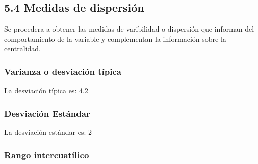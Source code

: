 \documentclass[
]{article}
\newenvironment{Shaded}{\begin{snugshade}}{\end{snugshade}}
\newcommand{\AttributeTok}[1]{\textcolor[rgb]{0.13,0.29,0.53}{#1}}
\newcommand{\CommentTok}[1]{\textcolor[rgb]{0.56,0.35,0.01}{\textit{#1}}}
\newcommand{\ConstantTok}[1]{\textcolor[rgb]{0.56,0.35,0.01}{#1}}
\newcommand{\FunctionTok}[1]{\textcolor[rgb]{0.13,0.29,0.53}{\textbf{#1}}}
\newcommand{\NormalTok}[1]{#1}
\newcommand{\OtherTok}[1]{\textcolor[rgb]{0.56,0.35,0.01}{#1}}
\newcommand{\SpecialCharTok}[1]{\textcolor[rgb]{0.81,0.36,0.00}{\textbf{#1}}}
\begin{document}
\hypertarget{medidas-de-dispersiuxf3n}{%
\subsection{5.4 Medidas de dispersión}\label{medidas-de-dispersiuxf3n}}

Se procedera a obtener las medidas de varibilidad o dispersión que
informan del comportamiento de la variable y complementan la información
sobre la centralidad.

\hypertarget{varianza-o-desviaciuxf3n-tuxedpica}{%
\subsubsection{Varianza o desviación
típica}\label{varianza-o-desviaciuxf3n-tuxedpica}}

\begin{Shaded}
\end{Shaded}

La desviación típica es: 4.2

\hypertarget{desviaciuxf3n-estuxe1ndar}{%
\subsubsection{Desviación Estándar}\label{desviaciuxf3n-estuxe1ndar}}

\begin{Shaded}
\end{Shaded}

La desviación estándar es: 2

\hypertarget{rango-intercuatuxedlico}{%
\subsubsection{Rango intercuatílico}\label{rango-intercuatuxedlico}}
\end{document}
